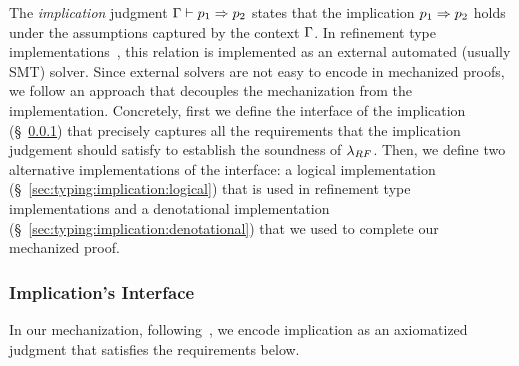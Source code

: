 The \emph{implication} judgment $\imply{\tcenv}{\spred_1}{\spred_2}$
states that the implication $p_1 \Rightarrow p_2$
holds under the assumptions captured by the context $\mathrm{\Gamma}$.
%
In refinement type implementations~\cite{newfstar,Seidel14}, this relation
is implemented as an external automated (usually SMT) solver.
%
Since external solvers are not easy to encode in mechanized proofs,
we follow an approach that decouples the mechanization from the implementation. 
Concretely, 
first we define the interface of the implication (\S~\ref{sec:typing:implication:interface})
that precisely captures all the requirements that the implication 
judgement should satisfy to establish the soundness of $\lambda_{RF}$. 
Then, we define two alternative implementations of the interface: 
a logical implementation (\S~\ref{sec:typing:implication:logical})
that is used in refinement type implementations 
and a denotational implementation (\S~\ref{sec:typing:implication:denotational})
that we used to complete our mechanized proof. 


\subsubsection{Implication's Interface}
\label{sec:typing:implication:interface}
In our mechanization, 
following~\citet{LehmannTanter}, 
we encode implication
as an axiomatized judgment that satisfies the
requirements below.



